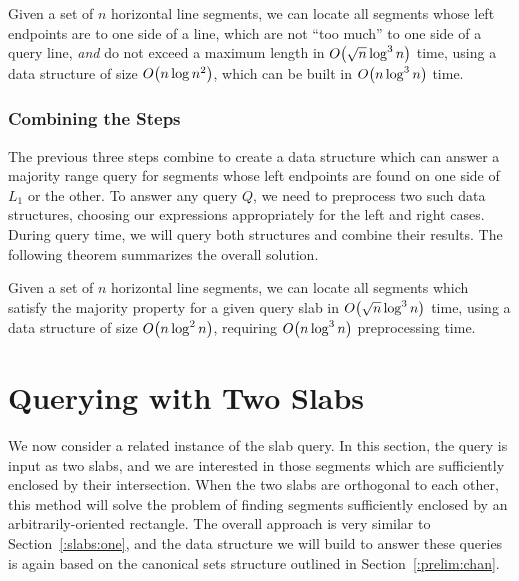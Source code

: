 \begin{lemma}
\label{lem:slabs:one:step3}
Given a set of $n$ horizontal line segments, we can locate all segments whose left endpoints are to one side of a line, which are not ``too much'' to one side of a query line, \emph{and} do not exceed a maximum length in $O\!\left(\sqrt{n}\log^3{n}\right)$ time, using a data structure of size $O\!\left(n\log{n}^2\right)$, which can be built in $O\!\left(n\log^3{n}\right)$ time.
\end{lemma}

\subsubsection{Combining the Steps}

The previous three steps combine to create a data structure which can answer a majority range query for segments whose left endpoints are found on one side of $L_1$ or the other.
To answer any query $Q$, we need to preprocess two such data structures, choosing our expressions appropriately for the left and right cases.
During query time, we will query both structures and combine their results.
The following theorem summarizes the overall solution.

\begin{theorem}
\label{th:slabs:one}
Given a set of $n$ horizontal line segments, we can locate all segments which satisfy the majority property for a given query slab in $O\!\left(\sqrt{n}\log^3{n}\right)$ time, using a data structure of size $O\!\left(n\log^2{n}\right)$, requiring $O\!\left(n\log^3{n}\right)$ preprocessing time.
\end{theorem}


\section{Querying with Two Slabs}
\label{:slabs:two}

We now consider a related instance of the slab query. 
In this section, the query is input as two slabs, and we are interested in those segments which are sufficiently enclosed by their intersection. 
When the two slabs are orthogonal to each other, this method will solve the problem of finding segments sufficiently enclosed by an arbitrarily-oriented rectangle.  
The overall approach is very similar to Section~\ref{:slabs:one}, and the data structure we will build to answer these queries is again based on the canonical sets structure outlined in Section~\ref{:prelim:chan}.


